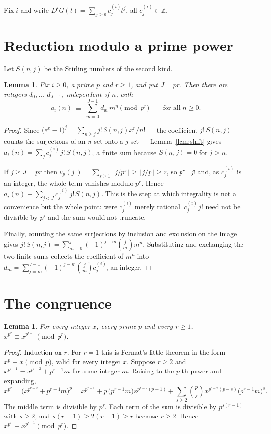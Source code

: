 \documentclass[11pt,a4paper]{article}
\theoremstyle{plain}
\newtheorem{lemma}[theorem]{Lemma}
\theoremstyle{definition}
\begin{document}
Fix $i$ and write $D^{i}G(t)=\sum_{j\ge0}c^{(i)}_j t^{j}$, all $c^{(i)}_j\in\mathbb{Z}$.

\section{Reduction modulo a prime power}

Let $S(n,j)$ be the Stirling numbers of the second kind.

\begin{lemma}\label{lem:exp}
Fix $i\ge0$, a prime $p$ and $r\ge1$, and put $J=pr$. Then there are integers
$d_0,\dots,d_{J-1}$, independent of $n$, with
\[
a_i(n)\;\equiv\;\sum_{m=0}^{J-1} d_m\,m^{n}\pmod{p^{r}}\qquad\text{for all } n\ge0 .
\]
\end{lemma}

\begin{proof}
Since $\bigl(e^{x}-1\bigr)^{j}=\sum_{n\ge j}j!\,S(n,j)x^{n}/n!$ --- the coefficient
$j!\,S(n,j)$ counts the surjections of an $n$-set onto a $j$-set --- Lemma~\ref{lem:shift}
gives $a_i(n)=\sum_{j}c^{(i)}_j\,j!\,S(n,j)$, a finite sum because $S(n,j)=0$ for $j>n$.

If $j\ge J=pr$ then $v_p(j!)=\sum_{s\ge1}\lfloor j/p^{s}\rfloor\ge\lfloor j/p\rfloor\ge r$,
so $p^{r}\mid j!$ and, as $c^{(i)}_j$ is an integer, the whole term vanishes modulo
$p^{r}$. Hence $a_i(n)\equiv\sum_{j<J}c^{(i)}_j\,j!\,S(n,j)$. This is the step at which
integrality is not a convenience but the whole point: were $c^{(i)}_j$ merely rational,
$c^{(i)}_j\,j!$ need not be divisible by $p^{r}$ and the sum would not truncate.

Finally, counting the same surjections by inclusion and exclusion on the image gives
$j!\,S(n,j)=\sum_{m=0}^{j}(-1)^{j-m}\binom{j}{m}m^{n}$. Substituting and exchanging the
two finite sums collects the coefficient of $m^{n}$ into
$d_m=\sum_{j=m}^{J-1}(-1)^{j-m}\binom{j}{m}c^{(i)}_j$, an integer.
\end{proof}

\section{The congruence}

\begin{lemma}\label{lem:lift}
For every integer $x$, every prime $p$ and every $r\ge1$,
$x^{p^{r}}\equiv x^{p^{r-1}}\pmod{p^{r}}$.
\end{lemma}

\begin{proof}
Induction on $r$. For $r=1$ this is Fermat's little theorem in the form $x^{p}\equiv x
\pmod p$, valid for every integer $x$. Suppose $r\ge2$ and
$x^{p^{r-1}}=x^{p^{r-2}}+p^{r-1}m$ for some integer $m$. Raising to the $p$-th power
and expanding,
\[
x^{p^{r}}=\bigl(x^{p^{r-2}}+p^{r-1}m\bigr)^{p}
= x^{p^{r-1}}
+ p\,\bigl(p^{r-1}m\bigr)x^{p^{r-2}(p-1)}
+ \sum_{s\ge2}\binom{p}{s}x^{p^{r-2}(p-s)}\bigl(p^{r-1}m\bigr)^{s} .
\]
The middle term is divisible by $p^{r}$. Each term of the sum is divisible by
$p^{s(r-1)}$ with $s\ge2$, and $s(r-1)\ge 2(r-1)\ge r$ because $r\ge2$. Hence
$x^{p^{r}}\equiv x^{p^{r-1}}\pmod{p^{r}}$.
\end{proof}
\end{document}
